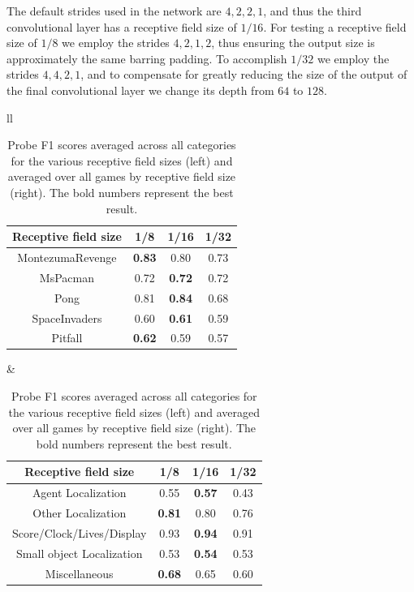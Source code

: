 The default strides used in the network are $4, 2, 2, 1$, and thus the third convolutional layer has a receptive field size of $1/16$. For testing a receptive field size of $1/8$ we employ the strides $4, 2, 1, 2$, thus ensuring the output size is approximately the same barring padding. To accomplish $1/32$ we employ the strides $4, 4, 2, 1$, and to compensate for greatly reducing the size of the output of the final convolutional layer we change its depth from $64$ to $128$.

\begin{table}[H]
\centering
\begin{tabular}{ll}
    \begin{tabular}{c|ccc}
         \toprule Receptive field size & 1/8 & 1/16 & 1/32 \\
         \hline MontezumaRevenge & \textbf{0.83} & 0.80 & 0.73  \\
         MsPacman & 0.72 & \textbf{0.72} & 0.72 \\
         Pong & 0.81 & \textbf{0.84} & 0.68 \\
         SpaceInvaders & 0.60 & \textbf{0.61} & 0.59 \\
         Pitfall & \textbf{0.62} & 0.59 & 0.57 \\\bottomrule
    \end{tabular}
&

    \begin{tabular}{c|ccc}
        \toprule Receptive field size & 1/8 & 1/16 & 1/32 \\
        \hline Agent Localization & 0.55 & \textbf{0.57} & 0.43 \\
        Other Localization & \textbf{0.81} & 0.80 & 0.76 \\
        Score/Clock/Lives/Display & 0.93 & \textbf{0.94} & 0.91 \\
        Small object Localization & 0.53 & \textbf{0.54} & 0.53 \\
        Miscellaneous & \textbf{0.68} & 0.65 & 0.60 \\\bottomrule
    \end{tabular}
\end{tabular}
\caption{Probe F1 scores averaged across all categories for the various receptive field sizes (left) and averaged over all games by receptive field size (right). The bold numbers represent the best result.}
\label{tab:receptive-field-results}
\end{table}

